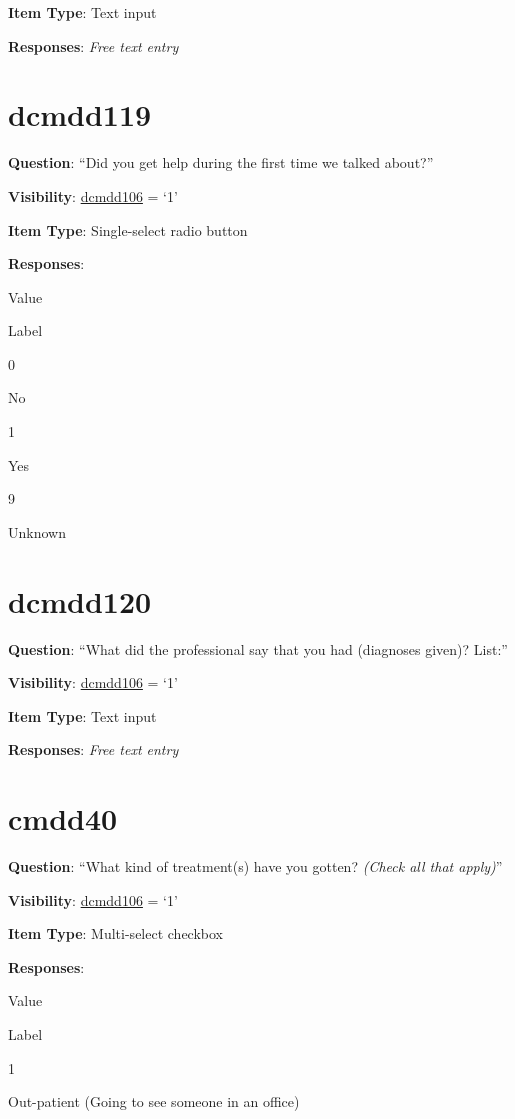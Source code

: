 \documentclass[]{book}
\begin{document}
\textbf{Item Type}: Text input

\textbf{Responses}: \emph{Free text entry}

\hypertarget{dcmdd119}{%
\section{dcmdd119}\label{dcmdd119}}

\textbf{Question}: ``Did you get help during the first time we talked about?''

\textbf{Visibility}: \protect\hyperlink{dcmdd106}{dcmdd106} = `1'

\textbf{Item Type}: Single-select radio button

\textbf{Responses}:

Value

Label

0

No

1

Yes

9

Unknown

\hypertarget{dcmdd120}{%
\section{dcmdd120}\label{dcmdd120}}

\textbf{Question}: ``What did the professional say that you had (diagnoses given)? List:''

\textbf{Visibility}: \protect\hyperlink{dcmdd106}{dcmdd106} = `1'

\textbf{Item Type}: Text input

\textbf{Responses}: \emph{Free text entry}

\hypertarget{cmdd40}{%
\section{cmdd40}\label{cmdd40}}

\textbf{Question}: ``What kind of treatment(s) have you gotten? \emph{(Check all that apply)}''

\textbf{Visibility}: \protect\hyperlink{dcmdd106}{dcmdd106} = `1'

\textbf{Item Type}: Multi-select checkbox

\textbf{Responses}:

Value

Label

1

Out-patient (Going to see someone in an office)
\end{document}
